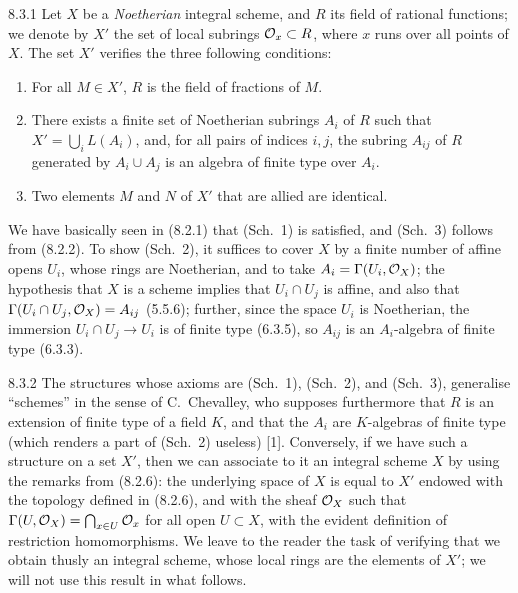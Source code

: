 \documentclass[../main.tex]{subfiles}
\begin{document}
\begin{cx}{8.3.1}
    Let $X$ be a \emph{Noetherian} integral scheme, and $R$ its field of rational functions; we denote by $X'$ the set of local subrings $\mathcal{O}_x\subset R$, where $x$ runs over all points of $X$.
    The set $X'$ verifies the three following conditions:
    \begin{enumerate}
        \item[(Sch. 1)] For all $M\in X'$, $R$ is the field of fractions of $M$.
        \item[(Sch. 2)] There exists a finite set of Noetherian subrings $A_i$ of $R$ such that $X'=\bigcup_i L(A_i)$, and, for all pairs of indices $i,j$, the subring $A_{ij}$ of $R$ generated by $A_i\cup A_j$ is an algebra of finite type over $A_i$.
        \item[(Sch. 3)] Two elements $M$ and $N$ of $X'$ that are allied are identical.
    \end{enumerate}
\end{cx}

We have basically seen in (8.2.1) that (Sch.~1) is satisfied, and (Sch.~3) follows from (8.2.2).
To show (Sch.~2), it suffices to cover $X$ by a finite number of affine opens $U_i$, whose rings are Noetherian, and to take $A_i=\Gamma(U_i,\mathcal{O}_X)$; the hypothesis that $X$ is a scheme implies that $U_i\cap U_j$ is affine, and also that $\Gamma(U_i\cap U_j,\mathcal{O}_X)=A_{ij}$ (5.5.6); further, since the space $U_i$ is Noetherian, the immersion $U_i\cap U_j\to U_i$ is of finite type (6.3.5), so $A_{ij}$ is an $A_i$-algebra of finite type (6.3.3).

\begin{cx}{8.3.2}
    The structures whose axioms are (Sch.~1), (Sch.~2), and (Sch.~3), generalise ``schemes'' in the sense of C.~Chevalley, who supposes furthermore that $R$ is an extension of finite type of a field $K$, and that the $A_i$ are $K$-algebras of finite type (which renders a part of (Sch.~2) useless) [1].
    Conversely, if we have such a structure on a set $X'$, then we can associate to it an integral scheme $X$ by using the remarks from (8.2.6): the underlying space of $X$ is equal to $X'$ endowed with the topology defined in (8.2.6), and with the sheaf $\mathcal{O}_X$ such that $\Gamma(U,\mathcal{O}_X)=\bigcap_{x\in U}\mathcal{O}_x$ for all open $U\subset X$, with the evident definition of restriction homomorphisms.
    We leave to the reader the task of verifying that we obtain thusly an integral scheme, whose local rings are the elements of $X'$; we will not use this result in what follows.
\end{cx}
\end{document}
